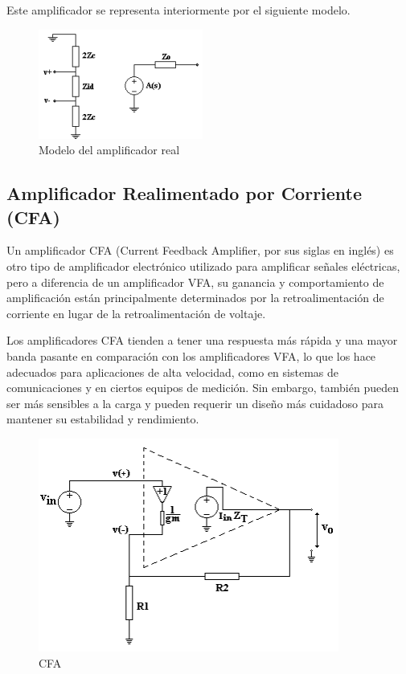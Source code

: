 \bigskip
\hspace{1mm} Este amplificador se representa interiormente por el siguiente modelo.

\bigskip
\begin{figure}[!h]
    \centering
    \includegraphics[scale=1]{img/VFA Modelo de amplificador real.png}
    \caption{Modelo del amplificador real}
\end{figure}

\newpage

\subsection{Amplificador Realimentado por Corriente (CFA)}

\hspace{1mm} Un amplificador CFA (Current Feedback Amplifier, por sus siglas en inglés) es otro tipo de amplificador electrónico utilizado para amplificar señales eléctricas, pero a diferencia de un amplificador VFA, su ganancia y comportamiento de amplificación están principalmente determinados por la retroalimentación de corriente en lugar de la retroalimentación de voltaje.

\bigskip
\hspace{1mm} Los amplificadores CFA tienden a tener una respuesta más rápida y una mayor banda pasante en comparación con los amplificadores VFA, lo que los hace adecuados para aplicaciones de alta velocidad, como en sistemas de comunicaciones y en ciertos equipos de medición. Sin embargo, también pueden ser más sensibles a la carga y pueden requerir un diseño más cuidadoso para mantener su estabilidad y rendimiento.

\bigskip
\begin{figure}[!h]
    \centering
    \includegraphics[scale=1]{img/CFA.png}
    \caption{CFA}
\end{figure}

